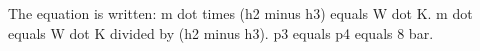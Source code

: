 The equation is written:  
m dot times (h2 minus h3) equals W dot K.  
m dot equals W dot K divided by (h2 minus h3).  
p3 equals p4 equals 8 bar.